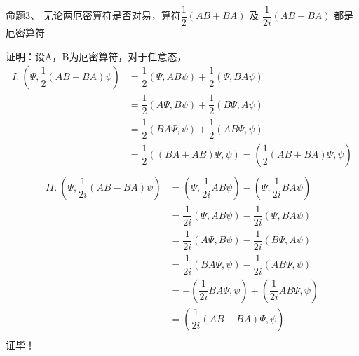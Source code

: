\begin{frame} [allowframebreaks=]
    \frametitle{}
    \begin{atcbox}{命题3、}
        无论两厄密算符是否对易，算符$\dfrac{1}{2}(AB+BA)$ 及 $\dfrac{1}{2i}(AB-BA) $ 都是厄密算符
    \end{atcbox}
    \alert{证明：}设A，B为厄密算符，对于任意态，
    \begin{equation*}
        \begin{split}
            I.~ (\Psi, \dfrac{1}{2}(AB+BA)\psi ) &=\dfrac{1}{2}(\Psi, AB\psi) + \dfrac{1}{2}(\Psi, BA\psi)  \\
            &=\dfrac{1}{2}(A\Psi, B\psi) + \dfrac{1}{2}(B\Psi, A\psi)  \\
            &=\dfrac{1}{2}(BA\Psi, \psi) + \dfrac{1}{2}(AB\Psi, \psi)  \\
            &=\dfrac{1}{2}((BA+AB)\Psi, \psi) =(\dfrac{1}{2}(AB+BA)\Psi, \psi)\\
         \end{split}
    \end{equation*}  
    \begin{equation*}
        \begin{split}
            II.~ (\Psi, \dfrac{1}{2i}(AB-BA)\psi ) &= (\Psi, \dfrac{1}{2i}AB\psi) - (\Psi, \dfrac{1}{2i}BA\psi)\\  
            &=\dfrac{1}{2i}(\Psi, AB\psi) - \dfrac{1}{2i}(\Psi, BA\psi)  \\
            &=\dfrac{1}{2i}(A\Psi, B\psi) - \dfrac{1}{2i}(B\Psi, A\psi)  \\
            &=\dfrac{1}{2i}(BA\Psi, \psi) - \dfrac{1}{2i}(AB\Psi, \psi)  \\
            &=-(\dfrac{1}{2i}BA\Psi, \psi) +(\dfrac{1}{2i}AB\Psi, \psi)  \\
            &=(\dfrac{1}{2i}(AB-BA)\Psi, \psi) \\
         \end{split}
    \end{equation*}  
    证毕！
\end{frame}  

